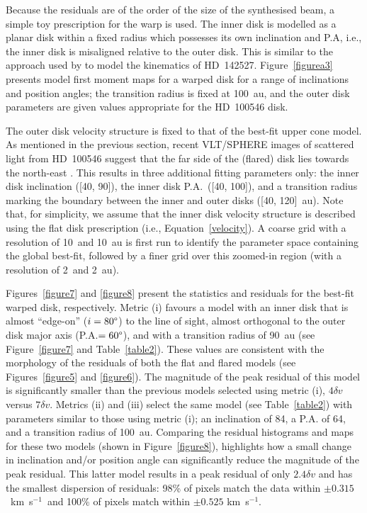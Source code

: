 \documentclass[onecolumn]{aastex6}
\newcommand{\kms}{km~s$^{-1}$}
\begin{document}
Because the residuals are of the order of the size of the synthesised beam, 
a simple toy prescription for the warp is used.  
The inner disk is modelled as a planar disk within a fixed radius which 
possesses its own inclination and P.A, i.e., the inner disk is 
misaligned relative to the outer disk.  
This is similar to the approach used by \citet{rosenfeld14} to 
model the kinematics of HD~142527.  
Figure~\ref{figurea3} presents model first moment maps for a warped 
disk for a range of inclinations and position angles; the 
transition radius is fixed at 100~au, and the outer disk parameters 
are given values appropriate for the HD~100546 disk.

The outer disk velocity structure is fixed to that of the best-fit upper cone model. 
As mentioned in the previous section, recent VLT/SPHERE images of scattered light 
from HD~100546 suggest that the far side of the (flared) disk lies towards the 
north-east \citep{garufi16}.  
This results in three additional fitting parameters only: 
the inner disk inclination ([40\degree, 90\degree]), the inner disk P.A.~([40\degree, 100\degree]), and 
a transition radius marking the boundary between the inner 
and outer disks ([40, 120]~au).  
Note that, for simplicity, we assume that the inner disk velocity structure is 
described using the flat disk prescription (i.e., Equation~\ref{velocity}). 
A coarse grid with a resolution of 10\degree~and 10~au is first run to 
identify the parameter space containing the global best-fit, followed by 
a finer grid over this zoomed-in region (with a resolution of 2\degree~and 2~au).  

Figures~\ref{figure7} and \ref{figure8} present the statistics and residuals for
the best-fit warped disk, respectively.   Metric (i) favours a model with an
inner disk that is almost ``edge-on''  ($i=80\degree$) to the line of sight,
almost orthogonal to the outer disk  major axis (P.A.$= 60\degree$), and with a
transition radius of 90~au  (see Figure~\ref{figure7} and Table~\ref{table2}).
These values are consistent with the morphology of the residuals of both  the
flat and flared models (see Figures~\ref{figure5} and \ref{figure6}).   The
magnitude of the peak residual of this model is significantly smaller than  the
previous models selected using metric (i), $4 \delta v$ versus $7 \delta v$.
Metrics (ii) and (iii) select the same model (see Table~\ref{table2})  with
parameters similar to those using metric (i); an inclination of  84\degree, a
P.A. of 64\degree, and a transition radius of 100~au.   Comparing the residual
histograms and maps for these two models (shown in  Figure~\ref{figure8}),
highlights how a small change in inclination and/or  position angle can
significantly reduce the magnitude of the peak residual.   This latter model
results in a peak residual of only $2.4 \delta v$ and has  the smallest
dispersion of residuals: 98\% of pixels match the data within  $\pm
0.315$~\kms~and 100\% of pixels match within $\pm 0.525$ \kms. 
\end{document}
